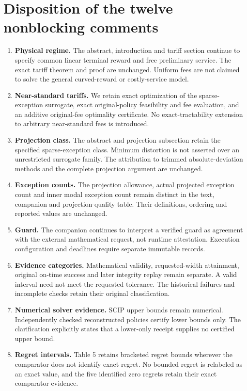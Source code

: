 \documentclass[11pt,letterpaper]{article}
\begin{document}
\section*{Disposition of the twelve nonblocking comments}
\begin{enumerate}[leftmargin=*,label=\textbf{\arabic*.}]
\item \textbf{Physical regime.} The abstract, introduction and tariff section continue to specify common linear terminal reward and free preliminary service. The exact tariff theorem and proof are unchanged. Uniform fees are not claimed to solve the general curved-reward or costly-service model.
\item \textbf{Near-standard tariffs.} We retain exact optimization of the sparse-exception surrogate, exact original-policy feasibility and fee evaluation, and an additive original-fee optimality certificate. No exact-tractability extension to arbitrary near-standard fees is introduced.
\item \textbf{Projection class.} The abstract and projection subsection retain the specified sparse-exception class. Minimum distortion is not asserted over an unrestricted surrogate family. The attribution to trimmed absolute-deviation methods and the complete projection argument are unchanged.
\item \textbf{Exception counts.} The projection allowance, actual projected exception count and inner modal exception count remain distinct in the text, companion and projection-quality table. Their definitions, ordering and reported values are unchanged.
\item \textbf{Guard.} The companion continues to interpret a verified guard as agreement with the external mathematical request, not runtime attestation. Execution configuration and deadlines require separate immutable records.
\item \textbf{Evidence categories.} Mathematical validity, requested-width attainment, original on-time success and later integrity replay remain separate. A valid interval need not meet the requested tolerance. The historical failures and incomplete checks retain their original classification.
\item \textbf{Numerical solver evidence.} SCIP upper bounds remain numerical. Independently checked reconstructed policies certify lower bounds only. The clarification explicitly states that a lower-only receipt supplies no certified upper bound.
\item \textbf{Regret intervals.} Table 5 retains bracketed regret bounds wherever the comparator does not identify exact regret. No bounded regret is relabeled as an exact value, and the five identified zero regrets retain their exact comparator evidence.

\end{enumerate}
\end{document}
